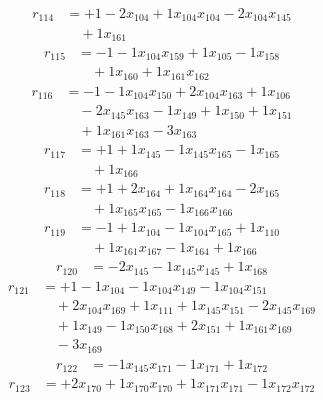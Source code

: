 \[\begin{aligned}
r_{114} &= + 1 - 2 x_{104} + 1 x_{104} x_{104} - 2 x_{104} x_{145} \\
 &\quad + 1 x_{161}
\end{aligned}\]
\[\begin{aligned}
r_{115} &= - 1 - 1 x_{104} x_{159} + 1 x_{105} - 1 x_{158} \\
 &\quad + 1 x_{160} + 1 x_{161} x_{162}
\end{aligned}\]
\[\begin{aligned}
r_{116} &= - 1 - 1 x_{104} x_{150} + 2 x_{104} x_{163} + 1 x_{106} \\
 &\quad - 2 x_{145} x_{163} - 1 x_{149} + 1 x_{150} + 1 x_{151} \\
 &\quad + 1 x_{161} x_{163} - 3 x_{163}
\end{aligned}\]
\[\begin{aligned}
r_{117} &= + 1 + 1 x_{145} - 1 x_{145} x_{165} - 1 x_{165} \\
 &\quad + 1 x_{166}
\end{aligned}\]
\[\begin{aligned}
r_{118} &= + 1 + 2 x_{164} + 1 x_{164} x_{164} - 2 x_{165} \\
 &\quad + 1 x_{165} x_{165} - 1 x_{166} x_{166}
\end{aligned}\]
\[\begin{aligned}
r_{119} &= - 1 + 1 x_{104} - 1 x_{104} x_{165} + 1 x_{110} \\
 &\quad + 1 x_{161} x_{167} - 1 x_{164} + 1 x_{166}
\end{aligned}\]
\[\begin{aligned}
r_{120} &= - 2 x_{145} - 1 x_{145} x_{145} + 1 x_{168}
\end{aligned}\]
\[\begin{aligned}
r_{121} &= + 1 - 1 x_{104} - 1 x_{104} x_{149} - 1 x_{104} x_{151} \\
 &\quad + 2 x_{104} x_{169} + 1 x_{111} + 1 x_{145} x_{151} - 2 x_{145} x_{169} \\
 &\quad + 1 x_{149} - 1 x_{150} x_{168} + 2 x_{151} + 1 x_{161} x_{169} \\
 &\quad - 3 x_{169}
\end{aligned}\]
\[\begin{aligned}
r_{122} &= - 1 x_{145} x_{171} - 1 x_{171} + 1 x_{172}
\end{aligned}\]
\[\begin{aligned}
r_{123} &= + 2 x_{170} + 1 x_{170} x_{170} + 1 x_{171} x_{171} - 1 x_{172} x_{172}
\end{aligned}\]
